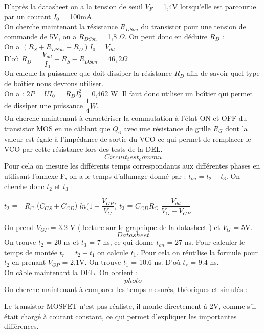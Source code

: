 \documentclass[a4paper]{report}
\begin{document}
D'après la datasheet on a la tension de seuil $V_F$ = 1,4V lorsqu'elle est parcourue par un courant $I_0$ = 100mA.\\
On cherche maintenant la résistance $R_{DSon}$ du transistor pour une tension de commande de 5V, on a $R_{DSon}$ = 1,8 $\Omega$. On peut donc en déduire $R_D$ :\\
On a $(R_S + R_{DSon} + R_D) I_0 = V_{dd}$\\
D'où $R_D$ = $\dfrac{V_{dd}}{I_0} - R_S -R_{DSon}$ = $46,2 \Omega$\\
On calcule la puissance que doit dissiper la résistance $R_D$ afin de savoir quel type de boîtier nous devrons utiliser.\\
On a : $2P = UI_0$ = $R_DI_0^2$ = 0,462 W. Il faut donc utiliser un boîtier qui permet de dissiper une puissance $\dfrac{1}{4}W$.\\
On cherche maintenant à caractériser la commutation à l'état ON et OFF du transistor MOS en ne câblant que $Q_6$ avec une résistance de grille $R_G$ dont la valeur est égale à l'impédance de sortie du VCO ce qui permet de remplacer le VCO par cette résistance lors des tests de la DEL.
$$Circuit_test_commu$$
Pour cela on mesure les différents temps correspondants aux différentes phases en utilisant l'annexe F, on a le temps d'allumage donné par :  $t_{on} = t_2 + t_3$. On cherche donc $t_2$ et $t_3$ :  \\
\begin{center}

$t_2$ = - $R_G$ ($C_{GS} + C_{GD}$) $ ln(1-\dfrac{V_{GP}}{V_G}$)
$t_3$ = $C_{GD}R_G$ $\dfrac{V_{dd}}{V_G - V_{GP}}$

\end{center}
On prend $V_{GP}$ = 3.2 V ( lecture sur le graphique de la datasheet ) et $V_G$ = 5V.\\
$$Datasheet$$
On trouve $t_2$ = 20 ns et $t_3$ = 7 ns, ce qui donne $t_{on}$ = 27 ns.
Pour calculer le temps de montée $t_r$ = $t_2 - t_1$ on calcule $t_1$. Pour cela on réutilise la formule pour $t_2$ en prenant $V_{GP}$ = 2.1V. On trouve $t_1$ = 10.6 ns. D'où $t_r$ = 9.4 ns.\\
On câble maintenant la DEL. On obtient : \\
$$photo$$
On cherche maintenant à comparer les temps mesurés, théoriques et simulés : \\
\begin{center}
\end{center}
Le transistor MOSFET n'est pas réaliste, il monte directement à 2V, comme s'il était chargé à courant constant, ce qui permet d'expliquer les importantes différences.
\end{document}

